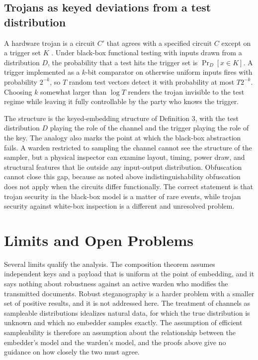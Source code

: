 \documentclass[11pt]{article}
\theoremstyle{definition}
\theoremstyle{remark}
\begin{document}
\subsection{Trojans as keyed deviations from a test distribution}

A hardware trojan is a circuit $C'$ that agrees with a specified circuit $C$ except on a trigger set $K$ \cite{tehranipoor2010}. Under black-box functional testing with inputs drawn from a distribution $D$, the probability that a test hits the trigger set is $\Pr_D[x\in K]$. A trigger implemented as a $k$-bit comparator on otherwise uniform inputs fires with probability $2^{-k}$, so $T$ random test vectors detect it with probability at most $T2^{-k}$. Choosing $k$ somewhat larger than $\log T$ renders the trojan invisible to the test regime while leaving it fully controllable by the party who knows the trigger.

The structure is the keyed-embedding structure of Definition 3, with the test distribution $D$ playing the role of the channel and the trigger playing the role of the key. The analogy also marks the point at which the black-box abstraction fails. A warden restricted to sampling the channel cannot see the structure of the sampler, but a physical inspector can examine layout, timing, power draw, and structural features that lie outside any input-output distribution. Obfuscation cannot close this gap, because as noted above indistinguishability obfuscation does not apply when the circuits differ functionally. The correct statement is that trojan security in the black-box model is a matter of rare events, while trojan security against white-box inspection is a different and unresolved problem.

\section{Limits and Open Problems}

Several limits qualify the analysis. The composition theorem assumes independent keys and a payload that is uniform at the point of embedding, and it says nothing about robustness against an active warden who modifies the transmitted documents. Robust steganography is a harder problem with a smaller set of positive results, and it is not addressed here. The treatment of channels as sampleable distributions idealizes natural data, for which the true distribution is unknown and which no embedder samples exactly. The assumption of efficient sampleability is therefore an assumption about the relationship between the embedder's model and the warden's model, and the proofs above give no guidance on how closely the two must agree.
\end{document}
